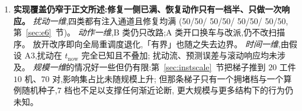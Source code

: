 \documentclass[manuscript,screen,review]{acmart}
\newcommand{\NPairs}{50}
\newcommand{\PubCloSpread}{0.207}
\newcommand{\ScaleKs}{7}
\newcommand{\ScalePairs}{70}
\newcommand{\ScaleJobsHi}{20}
\newcommand{\ScaleMachHi}{10}
\newcommand{\FeasESixBlock}{\NPairs/\NPairs}
\newcommand{\FeasSlow}{\NPairs/\NPairs}
\newcommand{\FeasESixAgv}{\NPairs/\NPairs}
\newcommand{\FeasESixRa}{\NPairs/\NPairs}
\begin{document}
\begin{enumerate}[leftmargin=1.6em,itemsep=0.35em]
\emph{(iv) 影响集规模的结构可预测性未能建立,且已知不由静态割给出}:
装卸点最小割与漏斗占比都没有做出可复现的区分;换用外部来源布局后这一点变得更确定——这两个指标
在整批外部算例上\emph{取值恒定}(两张路网都把装卸站放在网格角点,四邻接下角点恰有两条
出边),而影响集占比在\emph{同一张}路网上仅换机器落位就变动 \PubCloSpread(第~\ref{sec:e4}~节)。
这条否定只针对「静态割能解释影响集规模」,\emph{不是}「路网几何与影响集规模无关」——后者需要更多张
互不相同的公开路网才能检验,而可得的公开路网就这么多。下一个候选刻画应是
\(t_{\mathrm{now}}\) 邻域内走廊占用的时序密度,本文未做。

\item \textbf{实现覆盖仍窄于正文所述:修复一侧已满、恢复动作只有一档半、只做一次响应。}
\emph{扰动一维},四类都有注入通道且修复均满
(\FeasESixBlock / \FeasSlow / \FeasESixAgv / \FeasESixRa,第~\ref{sec:e6}~节)。
\emph{动作一维},B 类仍只改路;A 类开口换车与改派,仍不改扫描序。
放开改序即向全局重调度退化,「有界」也随之失去边界。
\emph{时间一维},由假设 A3,扰动在 \(t_{\mathrm{now}}\) 完全已知且不叠加;
扰动流、预测误差与滚动响应均未涉及。
\emph{规模一维}的情况好一些但仍有限:第~\ref{sec:instscale}~节把梯子推到
\(\ScaleJobsHi\) 工件 \(\ScaleMachHi\) 机、\(\ScalePairs\) 对,影响集占比未随规模上升;
但那条梯子只有一个拥堵档与一个算例随机种子,\(\ScaleKs\) 档也不足以支撑任何渐近论断,
更大规模与更多结构下的行为仍未知。


\end{enumerate}
\end{document}
